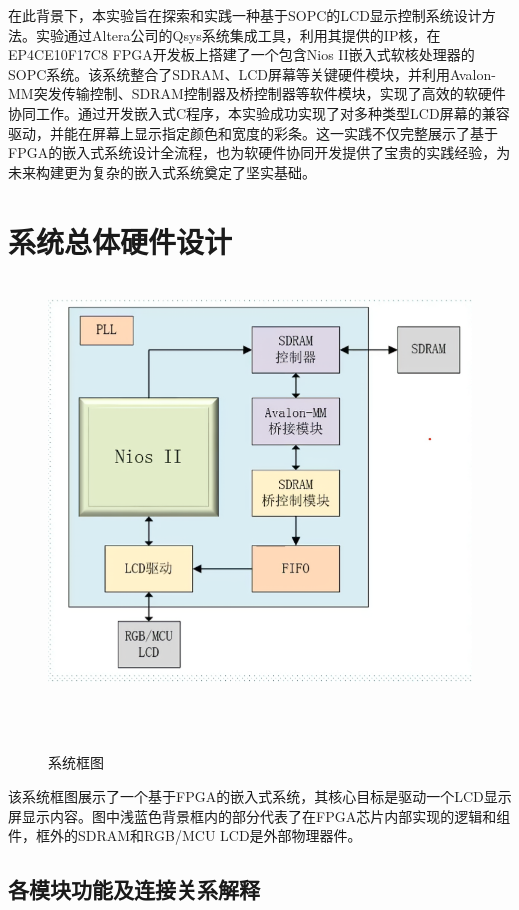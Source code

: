 \documentclass[12pt,hyperref,a4paper,UTF8]{ctexart}
\begin{document}
在此背景下，本实验旨在探索和实践一种基于SOPC的LCD显示控制系统设计方法。实验通过Altera公司的Qsys系统集成工具，利用其提供的IP核，在EP4CE10F17C8 FPGA开发板上搭建了一个包含Nios II嵌入式软核处理器的SOPC系统。该系统整合了SDRAM、LCD屏幕等关键硬件模块，并利用Avalon-MM突发传输控制、SDRAM控制器及桥控制器等软件模块，实现了高效的软硬件协同工作。通过开发嵌入式C程序，本实验成功实现了对多种类型LCD屏幕的兼容驱动，并能在屏幕上显示指定颜色和宽度的彩条。这一实践不仅完整展示了基于FPGA的嵌入式系统设计全流程，也为软硬件协同开发提供了宝贵的实践经验，为未来构建更为复杂的嵌入式系统奠定了坚实基础。


\section{系统总体硬件设计}


\begin{figure}[H] %
        \centering
        \includegraphics[width=1\textwidth]{figures/001.png} %
        \caption{系统框图} %
        \label{fig:example} %
\end{figure}

该系统框图展示了一个基于FPGA的嵌入式系统，其核心目标是驱动一个LCD显示屏显示内容。图中浅蓝色背景框内的部分代表了在FPGA芯片内部实现的逻辑和组件，框外的SDRAM和RGB/MCU LCD是外部物理器件。

\subsection*{各模块功能及连接关系解释}
\end{document}

